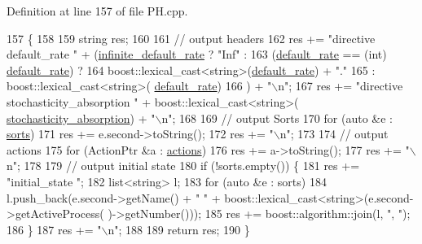 Definition at line 157 of file P\+H.\+cpp.


\begin{DoxyCode}
157                          \{
158 
159     \textcolor{keywordtype}{string} res;
160 
161     \textcolor{comment}{// output headers}
162     res += \textcolor{stringliteral}{"directive default\_rate "} + (\hyperlink{classPH_aa66efaf095a379c3b108a023d7c98afa}{infinite\_default\_rate} ? \textcolor{stringliteral}{"Inf"} :
163                                         (\hyperlink{classPH_a7a9525bc83257efefbaf9e78d96723ca}{default\_rate} == (int) 
      \hyperlink{classPH_a7a9525bc83257efefbaf9e78d96723ca}{default\_rate}) ?
164                                         boost::lexical\_cast<\textcolor{keywordtype}{string}>(\hyperlink{classPH_a7a9525bc83257efefbaf9e78d96723ca}{default\_rate}) + \textcolor{stringliteral}{"."}
165                                         :   boost::lexical\_cast<string>(
      \hyperlink{classPH_a7a9525bc83257efefbaf9e78d96723ca}{default\_rate})
166                                        ) + \textcolor{stringliteral}{"\(\backslash\)n"};
167     res += \textcolor{stringliteral}{"directive stochasticity\_absorption "} + boost::lexical\_cast<\textcolor{keywordtype}{string}>(
      \hyperlink{classPH_abdd55c7db00c19b89de0afba20d97b24}{stochasticity\_absorption}) + \textcolor{stringliteral}{"\(\backslash\)n"};
168 
169     \textcolor{comment}{// output Sorts}
170     \textcolor{keywordflow}{for} (\textcolor{keyword}{auto} &e : \hyperlink{classPH_a889cc129633e88e4257f56dec04c5bac}{sorts})
171         res += e.second->toString();
172     res += \textcolor{stringliteral}{"\(\backslash\)n"};
173 
174     \textcolor{comment}{// output actions}
175     \textcolor{keywordflow}{for} (ActionPtr &a : \hyperlink{classPH_a730f2eb0cd79487213cac9565d746a05}{actions})
176         res += a->toString();
177     res += \textcolor{stringliteral}{"\(\backslash\)n"};
178 
179     \textcolor{comment}{// output initial state}
180     \textcolor{keywordflow}{if} (!sorts.empty()) \{
181         res += \textcolor{stringliteral}{"initial\_state "};
182         list<string> l;
183         \textcolor{keywordflow}{for} (\textcolor{keyword}{auto} &e : sorts)
184             l.push\_back(e.second->getName() + \textcolor{stringliteral}{" "} + boost::lexical\_cast<\textcolor{keywordtype}{string}>(e.second->getActiveProcess(
      )->getNumber()));
185         res += boost::algorithm::join(l, \textcolor{stringliteral}{", "});
186     \}
187     res += \textcolor{stringliteral}{"\(\backslash\)n"};
188 
189     \textcolor{keywordflow}{return} res;
190 \}
\end{DoxyCode}



